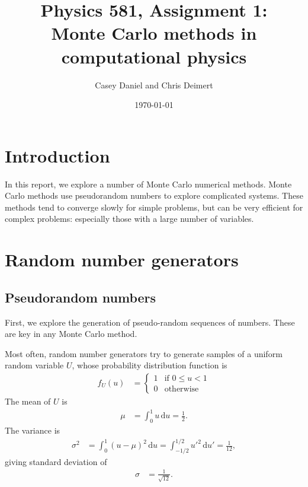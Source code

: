 \documentclass[twocolumn]{myarticle}
\renewcommand{\d}{\mathrm{d}}
\begin{document}
\title{Physics 581, Assignment 1:\\Monte Carlo methods in computational physics}
\author{Casey Daniel and Chris Deimert}
\date{\today}

\maketitle

\section{Introduction}
\label{sec:introduction}

In this report, we explore a number of Monte Carlo numerical methods.
Monte Carlo methods use pseudorandom numbers to explore complicated systems.
These methods tend to converge slowly for simple problems, but can be very efficient for complex problems: especially those with a large number of variables.

\section{Random number generators}
\label{sec:random_number_generators}

\subsection{Pseudorandom numbers}
\label{subsec:pseudorandom_numbers}

First, we explore the generation of pseudo-random sequences of numbers.
These are key in any Monte Carlo method.

Most often, random number generators try to generate samples of a uniform random variable $ U $, whose probability distribution function is
\begin{align}
    f_U(u) &= \begin{cases} 1 & \text{if } 0 \leq u < 1 \\ 0 & \text{otherwise} \end{cases}
\end{align}
The mean of $ U $ is
\begin{align}
    \mu &= \int_{0}^{1} u \, \d u = \frac{1}{2}.
\end{align}
The variance is
\begin{align}
    \sigma^2 &= \int_0^1 \left(u - \mu\right)^2 \, \d u = \int_{-1/2}^{1/2} u'^2 \, \d u' = \frac{1}{12},
\end{align}
giving standard deviation of
\begin{align}
    \sigma &= \frac{1}{\sqrt{12}}.
\end{align}
\end{document}
